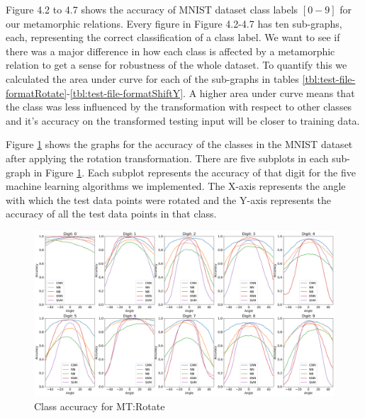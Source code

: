     Figure 4.2 to 4.7 shows the accuracy of MNIST dataset class labels $[0-9]$ for our metamorphic relations. Every figure in Figure 4.2-4.7 has ten sub-graphs, each, representing the correct classification of a class label. We want to see if there was a major difference in how each class is affected by a metamorphic relation to get a sense for robustness of the whole dataset. To quantify this we calculated the area under curve for each of the sub-graphs in tables \ref{tbl:test-file-formatRotate}-\ref{tbl:test-file-formatShiftY}. A higher area under curve means that the class was less influenced by the transformation with respect to other classes and it's accuracy on the transformed testing input will be closer to training data.
    
    Figure \ref{fig:Digit by misclassification for Rotation MR} shows the graphs for the accuracy of the classes in the MNIST dataset after applying the rotation transformation. There are five subplots in each sub-graph in Figure \ref{fig:Digit by misclassification for Rotation MR}. Each subplot represents the accuracy of that digit for the five machine learning algorithms we implemented. The X-axis represents the angle with which the test data points were rotated and the Y-axis represents the accuracy of all the test data points in that class.\\
    \begin{figure}[H]
    \centering
        \includegraphics[width=\textwidth]{chapters/results/MT/RotateAll.png}
        \caption{Class accuracy for MT:Rotate}
        \label{fig:Digit by misclassification for Rotation MR}
    \end{figure}
    
